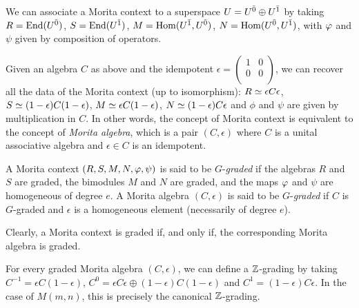 We can associate a Morita context to a superspace $U = U^{\bar0} \oplus U^{\bar1}$ by taking $R = \operatorname{End}(U^{\bar0})$, $S = \operatorname{End}(U^{\bar1})$, $M = \operatorname{Hom}(U^{\bar1}, U^{\bar0})$,
$N = \operatorname{Hom} (U^{\bar0}, U^{\bar1})$, with $\varphi$ and $\psi$ given by composition of operators.

Given an algebra $C$ as above and the idempotent
$
	\epsilon = \left(\begin{matrix}
			1 & 0 \\
			0 & 0 \\
		\end{matrix}
	\right)
$,
we can recover all the data of the Morita context (up to isomorphism): $R \simeq \epsilon C \epsilon$, $S \simeq (1 - \epsilon) C (1 - \epsilon)$, $M \simeq \epsilon C (1-\epsilon)$, $N \simeq (1-\epsilon) C \epsilon$ and $\phi$ and $\psi$ are given by multiplication in $C$. In other words, the concept of Morita context is equivalent to the concept of \emph{Morita algebra}, which is a pair $(C,\epsilon)$ where $C$ is a unital associative algebra and $\epsilon\in C$ is an idempotent.

\begin{defi}
	A Morita context $(R, S, M, N, \varphi, \psi )$ is said to be $G$-\emph{graded} if the algebras $R$ and $S$ are graded, the bimodules $M$ and $N$ are graded, and the maps $\varphi$ and $\psi$ are homogeneous of degree $e$. A Morita algebra $(C,\epsilon)$ is said to be $G$-\emph{graded} if $C$ is $G$-graded and $\epsilon$ is a homogeneous element (necessarily of degree $e$).
\end{defi}

Clearly, a Morita context is graded if, and only if, the corresponding Morita algebra is graded.

\begin{remark}\label{remarkk}
	For every graded Morita algebra $(C,\epsilon)$, we can define a $\mathbb{Z}$-grading by taking $C^{-1} = \epsilon C (1-\epsilon )$, $C^0 = \epsilon C \epsilon \oplus (1-\epsilon)C(1-\epsilon)$ and $C^1=(1-\epsilon)C\epsilon$. In the case of $M(m,n)$, this is precisely the canonical $\mathbb{Z}$-grading.
\end{remark}

